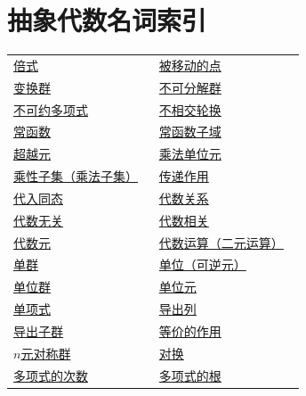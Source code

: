 \chapter*{抽象代数名词索引}
{}

\begingroup
\setlength{\tabcolsep}{8pt}
\renewcommand{\arraystretch}{1.25}
\begin{longtable}{@{}>{\raggedright\arraybackslash}p{0.47\linewidth}>{\raggedright\arraybackslash}p{0.47\linewidth}@{}}
\hline
\endfirsthead
\hline
\endhead
\hline
\endfoot
\hline
\endlastfoot
\hyperref[p2:concept:c3-divisibility]{倍式} & \hyperref[p2:concept:c2-l405]{被移动的点}\\
\hyperref[p2:concept:c1-l248]{变换群} & \hyperref[p2:concept:c2-l1600]{不可分解群}\\
\hyperref[p2:concept:c3-irreducible]{不可约多项式} & \hyperref[p2:concept:c1-l210]{不相交轮换}\\
\hyperref[p2:concept:c3-functions]{常函数} & \hyperref[p2:concept:c3-constant-subfield]{常函数子域}\\
\hyperref[p2:concept:c3-evaluation]{超越元} & \hyperref[p2:concept:c1-l954]{乘法单位元}\\
\hyperref[p2:concept:c3-multiplicative-set]{乘性子集（乘法子集）} & \hyperref[p2:concept:c2-l1035]{传递作用}\\
\hyperref[p2:concept:c3-evaluation]{代入同态} & \hyperref[p2:concept:c3-algebraic-relation]{代数关系}\\
\hyperref[p2:concept:c3-finitely-generated-ring]{代数无关} & \hyperref[p2:concept:c3-finitely-generated-ring]{代数相关}\\
\hyperref[p2:concept:c3-evaluation]{代数元} & \hyperref[p2:concept:c1-l19]{代数运算（二元运算）}\\
\hyperref[p2:concept:c2-l332]{单群} & \hyperref[p2:concept:c1-l956]{单位（可逆元）}\\
\hyperref[p2:concept:c1-l963]{单位群} & \hyperref[p2:concept:c1-l40]{单位元}\\
\hyperref[p2:concept:c3-multivariate-ring]{单项式} & \hyperref[p2:concept:c2-l504]{导出列}\\
\hyperref[p2:concept:c2-l504]{导出子群} & \hyperref[p2:concept:c2-l1004]{等价的作用}\\
\hyperref[p2:concept:c1-l193]{$n$元对称群} & \hyperref[p2:concept:c1-l210]{对换}\\
\hyperref[p2:concept:c3-degree]{多项式的次数} & \hyperref[p2:concept:c3-evaluation]{多项式的根}\\

\end{longtable}
